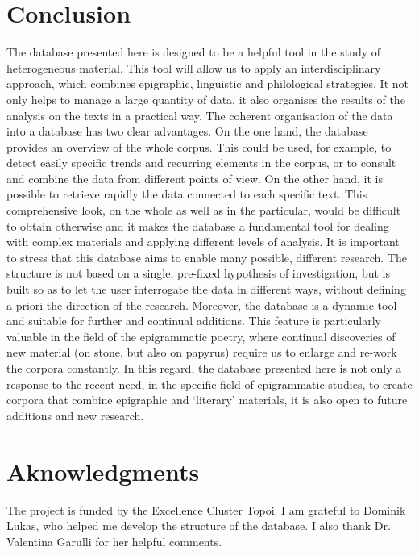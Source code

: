 \documentclass[amsthm,ebook]{saparticle}
\begin{document}
\section{Conclusion}


\noindent The database presented here is designed to be a helpful tool in the study of heterogeneous material. This tool will allow us to apply an interdisciplinary approach, which combines epigraphic, linguistic and philological strategies. It not only helps to manage a large quantity of data, it also organises the results of the analysis on the texts in a practical way. 
The coherent organisation of the data into a database has two clear advantages. On the one hand, the database provides an overview of the whole corpus. This could be used, for example, to detect easily specific trends and recurring elements in the corpus, or to consult and combine the data from different points of view. On the other hand, it is possible to retrieve rapidly the data connected to each specific text. This comprehensive look, on the whole as well as in the particular, would be difficult to obtain otherwise and it makes the database a fundamental tool for dealing with complex materials and applying different levels of analysis.
It is important to stress that this database aims to enable many possible, different research. The structure is not based on a single, pre-fixed hypothesis of investigation, but is built so as to let the user interrogate the data in different ways, without defining a priori the direction of the research. 
Moreover, the database is a dynamic tool and suitable for further and continual additions. This feature is particularly valuable in the field of the epigrammatic poetry, where continual discoveries of new material (on stone, but also on papyrus) require us to enlarge and re-work the corpora constantly. In this regard, the database presented here is not only a response to the recent need, in the specific field of epigrammatic studies, to create corpora that combine epigraphic and `literary' materials, it is also open to future additions and new research.




\section*{Aknowledgments}

\noindent The project is funded by the Excellence Cluster Topoi. I am grateful to Dominik Lukas, who helped me develop the
structure of the database. I also thank Dr. Valentina Garulli for her helpful comments.



\end{document}
